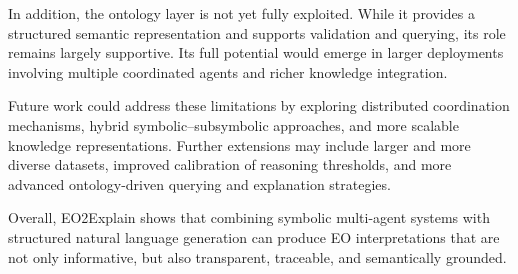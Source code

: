 \documentclass[12pt]{article}
\begin{document}
In addition, the ontology layer is not yet fully exploited. While it provides a structured semantic representation and supports validation and querying, its role remains largely supportive. Its full potential would emerge in larger deployments involving multiple coordinated agents and richer knowledge integration.

Future work could address these limitations by exploring distributed coordination mechanisms, hybrid symbolic–subsymbolic approaches, and more scalable knowledge representations. Further extensions may include larger and more diverse datasets, improved calibration of reasoning thresholds, and more advanced ontology-driven querying and explanation strategies.

Overall, EO2Explain shows that combining symbolic multi-agent systems with structured natural language generation can produce EO interpretations that are not only informative, but also transparent, traceable, and semantically grounded.
\newpage



\end{document}
